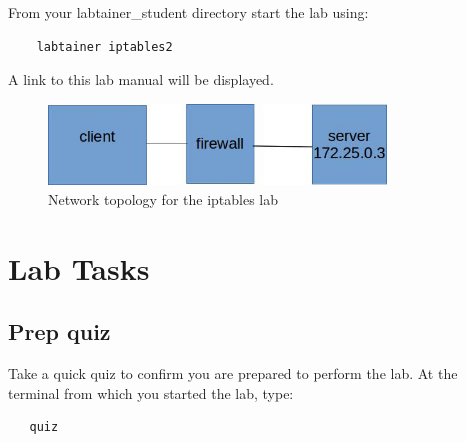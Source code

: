 From your labtainer_student directory start the lab using:
\begin{verbatim}
    labtainer iptables2
\end{verbatim}
\noindent A link to this lab manual will be displayed.  


\begin{figure}[H]
\begin{center}
\includegraphics [width=0.8\textwidth]{iptables.jpg}
\end{center}
\caption{Network topology for the iptables lab}
\label{fig:topology}
\end{figure}

\section{Lab Tasks}
\subsection{Prep quiz}
Take a quick quiz to confirm you are prepared to perform the lab.
At the terminal from which you started the lab, type: 
\begin{verbatim}
   quiz
\end{verbatim}
